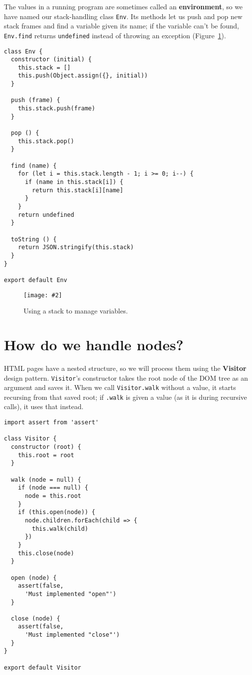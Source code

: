 \documentclass[krantzl]{krantz}
\newcommand{\figpdf}[4]{\begin{figure}%
\centering%
\texttt{[image: \#2]}%
\caption{#3}%
\label{#1}%
\end{figure}}
\newcommand{\figref}[1]{Figure~\ref{#1}}
\newcommand{\glossref}[1]{\textbf{#1}}
\begin{document}
The values in a running program are sometimes called
an \glossref{environment},
so we have named our stack-handling class \texttt{Env}.
Its methods let us push and pop new stack frames
and find a variable given its name;
if the variable can't be found,
\texttt{Env.find} returns \texttt{undefined} instead of throwing an exception
(\figref{page-templates-stack}).


\begin{lstlisting}[frame=single,frameround=tttt]
class Env {
  constructor (initial) {
    this.stack = []
    this.push(Object.assign({}, initial))
  }

  push (frame) {
    this.stack.push(frame)
  }

  pop () {
    this.stack.pop()
  }

  find (name) {
    for (let i = this.stack.length - 1; i >= 0; i--) {
      if (name in this.stack[i]) {
        return this.stack[i][name]
      }
    }
    return undefined
  }

  toString () {
    return JSON.stringify(this.stack)
  }
}

export default Env
\end{lstlisting}


\figpdf{page-templates-stack}{./page-templates/stack.pdf}{Using a stack to manage variables.}{0.6}

\section{How do we handle nodes?}\label{page-templates-nodes}


HTML pages have a nested structure,
so we will process them using
the \glossref{Visitor} design pattern.
\texttt{Visitor}'s constructor takes the root node of the DOM tree as an argument and saves it.
When we call \texttt{Visitor.walk} without a value,
it starts recursing from that saved root;
if \texttt{.walk} is given a value (as it is during recursive calls),
it uses that instead.


\begin{lstlisting}[frame=single,frameround=tttt]
import assert from 'assert'

class Visitor {
  constructor (root) {
    this.root = root
  }

  walk (node = null) {
    if (node === null) {
      node = this.root
    }
    if (this.open(node)) {
      node.children.forEach(child => {
        this.walk(child)
      })
    }
    this.close(node)
  }

  open (node) {
    assert(false,
      'Must implemented "open"')
  }

  close (node) {
    assert(false,
      'Must implemented "close"')
  }
}

export default Visitor
\end{lstlisting}
\end{document}
